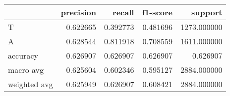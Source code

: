 \begin{tabular}{lrrrr}
\toprule
{} &  precision &    recall &  f1-score &      support \\
\midrule
T            &   0.622665 &  0.392773 &  0.481696 &  1273.000000 \\
A            &   0.628544 &  0.811918 &  0.708559 &  1611.000000 \\
accuracy     &   0.626907 &  0.626907 &  0.626907 &     0.626907 \\
macro avg    &   0.625604 &  0.602346 &  0.595127 &  2884.000000 \\
weighted avg &   0.625949 &  0.626907 &  0.608421 &  2884.000000 \\
\bottomrule
\end{tabular}
